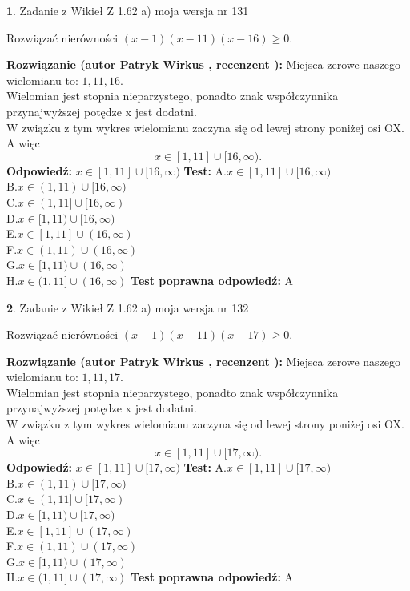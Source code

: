 \documentclass[12pt, a4paper]{article}
\theoremstyle{definition} %
\newtheorem{zad}{}
\newcommand{\zadStart}[1]{\begin{zad}#1\newline}
\newcommand{\zadStop}{\end{zad}}
\newcommand{\rozwStart}[2]{\noindent \textbf{Rozwiązanie (autor #1 , recenzent #2): }\newline}
\newcommand{\rozwStop}{\newline}
\newcommand{\odpStart}{\noindent \textbf{Odpowiedź:}\newline}
\newcommand{\odpStop}{\newline}
\newcommand{\testStart}{\noindent \textbf{Test:}\newline}
\newcommand{\testStop}{\newline}
\newcommand{\kluczStart}{\noindent \textbf{Test poprawna odpowiedź:}\newline}
\newcommand{\kluczStop}{\newline}
\begin{document}
\zadStart{Zadanie z Wikieł Z 1.62 a) moja wersja nr 131}

Rozwiązać nierówności $(x-1)(x-11)(x-16)\ge0$.
\zadStop
\rozwStart{Patryk Wirkus}{}
Miejsca zerowe naszego wielomianu to: $1, 11, 16$.\\
Wielomian jest stopnia nieparzystego, ponadto znak współczynnika przy\linebreak najwyższej potędze x jest dodatni.\\ W związku z tym wykres wielomianu zaczyna się od lewej strony poniżej osi OX. A więc $$x \in [1,11] \cup [16,\infty).$$
\rozwStop
\odpStart
$x \in [1,11] \cup [16,\infty)$
\odpStop
\testStart
A.$x \in [1,11] \cup [16,\infty)$\\
B.$x \in (1,11) \cup [16,\infty)$\\
C.$x \in (1,11] \cup [16,\infty)$\\
D.$x \in [1,11) \cup [16,\infty)$\\
E.$x \in [1,11] \cup (16,\infty)$\\
F.$x \in (1,11) \cup (16,\infty)$\\
G.$x \in [1,11) \cup (16,\infty)$\\
H.$x \in (1,11] \cup (16,\infty)$
\testStop
\kluczStart
A
\kluczStop



\zadStart{Zadanie z Wikieł Z 1.62 a) moja wersja nr 132}

Rozwiązać nierówności $(x-1)(x-11)(x-17)\ge0$.
\zadStop
\rozwStart{Patryk Wirkus}{}
Miejsca zerowe naszego wielomianu to: $1, 11, 17$.\\
Wielomian jest stopnia nieparzystego, ponadto znak współczynnika przy\linebreak najwyższej potędze x jest dodatni.\\ W związku z tym wykres wielomianu zaczyna się od lewej strony poniżej osi OX. A więc $$x \in [1,11] \cup [17,\infty).$$
\rozwStop
\odpStart
$x \in [1,11] \cup [17,\infty)$
\odpStop
\testStart
A.$x \in [1,11] \cup [17,\infty)$\\
B.$x \in (1,11) \cup [17,\infty)$\\
C.$x \in (1,11] \cup [17,\infty)$\\
D.$x \in [1,11) \cup [17,\infty)$\\
E.$x \in [1,11] \cup (17,\infty)$\\
F.$x \in (1,11) \cup (17,\infty)$\\
G.$x \in [1,11) \cup (17,\infty)$\\
H.$x \in (1,11] \cup (17,\infty)$
\testStop
\kluczStart
A
\kluczStop
\end{document}
